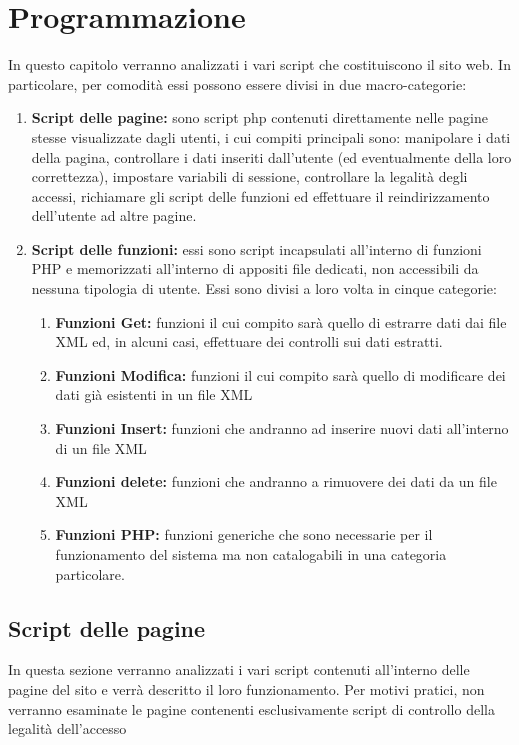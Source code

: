 \documentclass [a4paper, 12pt]{book}
\begin{document}
\chapter{Programmazione}
In questo capitolo verranno analizzati i vari script che costituiscono il sito web. In particolare, per comodità essi possono essere divisi in due macro-categorie:
\begin{enumerate}
\item \textbf{Script delle pagine:} sono script php contenuti direttamente nelle pagine stesse visualizzate dagli utenti, i cui compiti principali sono: manipolare i dati della pagina, controllare i dati inseriti dall'utente (ed eventualmente della loro correttezza), impostare variabili di sessione, controllare la legalità degli accessi, richiamare gli script delle funzioni ed effettuare il reindirizzamento dell'utente ad altre pagine.
\item \textbf{Script delle funzioni:} essi sono script incapsulati all'interno di funzioni PHP e memorizzati all'interno di appositi file dedicati, non accessibili da nessuna tipologia di utente. Essi sono divisi a loro volta in cinque categorie: 
\begin{enumerate}
\item \textbf{Funzioni Get:} funzioni il cui compito sarà quello di estrarre dati dai file XML ed, in alcuni casi, effettuare dei controlli sui dati estratti.
\item \textbf{Funzioni Modifica:} funzioni il cui compito sarà quello di modificare dei dati già esistenti in un file XML
\item \textbf{Funzioni Insert:} funzioni che andranno ad inserire nuovi dati all'interno di un file XML
\item \textbf{Funzioni delete:} funzioni che andranno a rimuovere dei dati da un file XML
\item \textbf{Funzioni PHP:} funzioni generiche che sono necessarie per il funzionamento del sistema ma non catalogabili in una categoria particolare.
\end{enumerate}
\end{enumerate}

\section{Script delle pagine}
In questa sezione verranno analizzati i vari script contenuti all'interno delle pagine del sito e verrà descritto il loro funzionamento. Per motivi pratici, non verranno esaminate le pagine contenenti esclusivamente script di controllo della legalità dell'accesso
\end{document}
